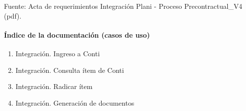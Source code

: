 \documentclass[
  paper=a4,
  ,captions=tableheading
]{scrartcl}
\providecommand{\tightlist}{%
  \setlength{\itemsep}{0pt}\setlength{\parskip}{0pt}}
\begin{document}
Fuente: Acta de requerimientos Integración Plani - Proceso
Precontractual\_V4 (pdf).

\paragraph{Índice de la documentación (casos de
uso)}\label{sec:uxedndice-de-la-documentaciuxf3n-casos-de-uso-2}

\begin{enumerate}
\def\labelenumi{\arabic{enumi}.}
\tightlist
\item
  Integración. Ingreso a Conti
\item
  Integración. Consulta ítem de Conti
\item
  Integración. Radicar ítem
\item
  Integración. Generación de documentos
\end{enumerate}
\end{document}
